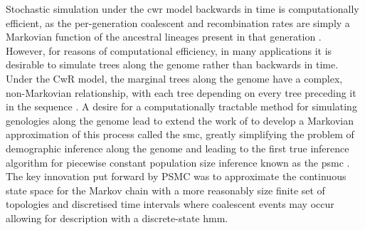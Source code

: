 Stochastic simulation under the \gls{cwr} model backwards in time is computationally efficient, as the per-generation coalescent and recombination rates are simply a Markovian function of the ancestral lineages present in that generation \cite{RR1983}. However, for reasons of computational efficiency, in many applications it is desirable to simulate trees along the genome rather than backwards in time. Under the CwR model, the marginal trees along the genome have a complex, non-Markovian relationship, with each tree depending on every tree preceding it in the sequence \cite{C1999}. A desire for a computationally tractable method for simulating genologies along the genome lead \textcite{McVean2005a} to extend the work of \textcite{C1999} to develop a Markovian approximation of this process called the \gls{smc}, greatly simplifying the problem of demographic inference along the genome and leading to the first true inference algorithm for piecewise constant population size inference known as the \gls{psmc} \cite{Li2011a}. The key innovation put forward by PSMC was to approximate the continuous state space for the Markov chain with a more reasonably size finite set of topologies and discretised time intervals where coalescent events may occur allowing for description with a discrete-state \gls{hmm}. 
